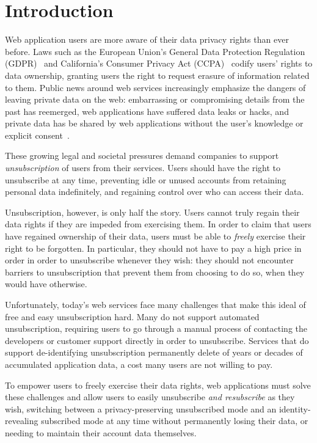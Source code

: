 \section{Introduction}

Web application users are more aware of their data privacy rights than ever before. 
Laws such as the European Union's General Data Protection Regulation (GDPR)~\cite{eu:gdpr} and
California's Consumer Privacy Act (CCPA)~\cite{ca:privacy-act} codify users' rights to 
data ownership, granting users the right to request erasure of information related to them.
%
Public news around web services increasingly emphasize the dangers of leaving private data on the
web: embarrassing or compromising details from the past has reemerged, web applications have 
suffered data leaks or hacks, and private data has be shared by web applications without the user's
knowledge or explicit consent~\cite{nytimes:fb, npr:data}.

%
These growing legal and societal pressures demand companies to support \emph{unsubscription} of
users from their services.  Users should have the right to unsubscribe at any time, preventing idle
or unused accounts from retaining personal data indefinitely, and regaining control over who can
access their data. 
%

%
Unsubscription, however, is only half the story. Users cannot truly regain their data rights if they
are impeded from exercising them. In order to claim that users have regained ownership of their
data, users must be able to \emph{freely} exercise their right to be forgotten. In particular, they
should not have to pay a high price in order in order to unsubscribe whenever they wish: they should
not encounter barriers to unsubscription that prevent them from choosing to do so, when they would have
otherwise. 

Unfortunately, today's web services face many challenges that make this ideal of free and easy
unsubscription hard.  Many do not support automated unsubscription, requiring users to go through a
manual process of contacting the developers or customer support directly in order to unsubscribe.
Services that do support de-identifying unsubscription permanently delete of years or decades of
accumulated application data, a cost many users are not willing to pay.

To empower users to freely exercise their data rights, web applications must solve these challenges
and allow users to easily unsubscribe \emph{and resubscribe} as they wish, switching between a
privacy-preserving unsubscribed mode and an identity-revealing subscribed mode at any time without
permanently losing their data, or needing to maintain their account data themselves. 

